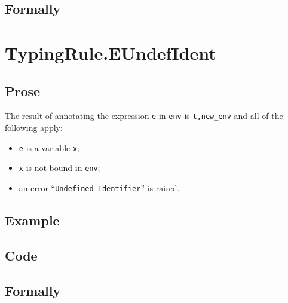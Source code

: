 \documentclass{book}
\begin{document}
\begin{emptyformal}
  \subsection{Formally}
\end{emptyformal}


\section{TypingRule.EUndefIdent \label{sec:TypingRule.EUndefIdent}}

  \subsection{Prose}
  The result of annotating the expression \texttt{e} in \texttt{env} is
\texttt{t,new\_env} and all of the following apply:
  \begin{itemize}
  \item \texttt{e} is a variable \texttt{x};
  \item \texttt{x} is not bound in \texttt{env};
  \item an error ``\texttt{Undefined Identifier}'' is raised.
  \end{itemize}

  \subsection{Example}

  \subsection{Code}

\begin{emptyformal}
  \subsection{Formally}
\end{emptyformal}

\end{document}
